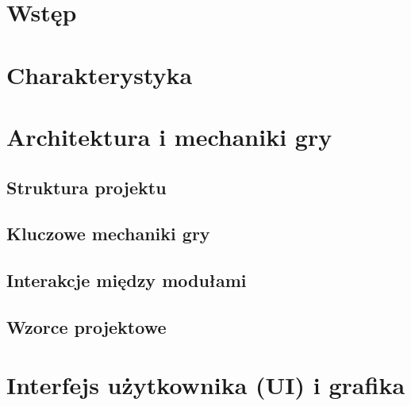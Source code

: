 \documentclass[12pt]{Tech}
\begin{document}


\thispagestyle{empty}

\newpage %
\tableofcontents %
\newpage %
\listoffigures %
\newpage
\renewcommand*{\lstlistingname}{Fragment kodu}
\renewcommand*{\lstlistlistingname}{Spis fragmentów kodu}
\lstlistoflistings
\newpage

\section{Wstęp}\label{sec:introduc}



\newpage

\section{Charakterystyka}\label{sec:desc}


\newpage

\section{Architektura i mechaniki gry}\label{sec:architec}

\subsection{Struktura projektu}

\subsection{Kluczowe mechaniki gry}

\subsection{Interakcje między modułami}

\subsection{Wzorce projektowe}


\newpage

\section{Interfejs użytkownika (UI) i grafika}\label{sec:ui}

\end{document}
